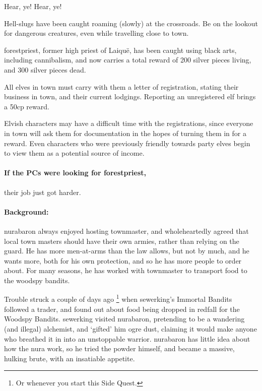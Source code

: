 \begin{multicols}{2}
\begin{speechtext}
  Hear, ye! Hear, ye!

  Hell-slugs have been caught roaming (slowly) at the crossroads.
  Be on the lookout for dangerous creatures, even while travelling close to \gls{town}.

  \Gls{forestpriest}, former high priest of Laiqu\"{e}, has been caught using black arts, including cannibalism, and now carries a total reward of 200 silver pieces living, and 300 silver pieces dead.

  All elves in \gls{town} must carry with them a letter of registration, stating their business in town, and their current lodgings.
  Reporting an unregistered elf brings a 50cp reward.

\end{speechtext}

Elvish characters may have a difficult time with the registrations, since everyone in \gls{town} will ask them for documentation in the hopes of turning them in for a reward.
Even characters who were previously friendly towards party elves begin to view them as a potential source of income.

\paragraph{If the PCs were looking for \gls{forestpriest},}
their job just got harder.

\stopcontents[sq]

\resumecontents[Town]

\label{desperatemeasures}

\stopcontents[Town]

\startcontents[sq]

\sqminitoc
\paragraph{Background:}
\gls{nurabaron} always enjoyed hosting \gls{townmaster}, and wholeheartedly agreed that local town masters should have their own armies, rather than relying on the \gls{guard}.
He has more men-at-arms than the law allows, but not by much, and he wants more, both for his own protection, and so he has more people to order about.
For many seasons, he has worked with \gls{townmaster} to transport food to the woodspy bandits.

Trouble struck a couple of days ago%
\footnote{Or whenever you start this Side Quest.}
when \gls{sewerking}'s Immortal Bandits followed a trader, and found out about food being dropped in \gls{redfall} for the Woodspy Bandits.
\Gls{sewerking} visited \gls{nurabaron}, pretending to be a wandering (and illegal) alchemist, and `gifted' him ogre dust, claiming it would make anyone who breathed it in into an unstoppable warrior.
\Gls{nurabaron} has little idea about how the nura work, so he tried the powder himself, and became a massive, hulking brute, with an insatiable appetite.


\end{multicols}
